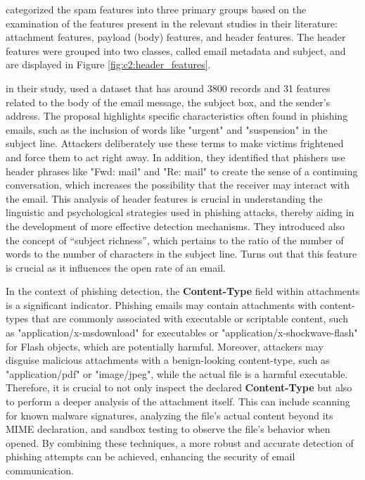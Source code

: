 
\citet{8257764} categorized the spam features into three primary groups based on the examination of the features present in the relevant studies in their literature: attachment features, payload (body) features, and header features. The header features were grouped into two classes, called email metadata and subject, and are displayed in Figure \ref{fig:c2:header_features}.



\citet{Abadla202312} in their study, used a dataset that has around 3800 records and 31 features related to the body of the email message, the subject box, and the sender’s address.
The proposal highlights specific characteristics often found in phishing emails, such as the inclusion of words like "urgent" and "suspension" in the subject line. Attackers deliberately use these terms to make victims frightened and force them to act right away. In addition, they identified that phishers use header phrases like "Fwd: mail" and "Re: mail" to create the sense of a continuing conversation, which increases the possibility that the receiver may interact with the email. This analysis of header features is crucial in understanding the linguistic and psychological strategies used in phishing attacks, thereby aiding in the development of more effective detection mechanisms. They introduced also the concept of “subject richness”, which pertains to the ratio of the number of words to the number of characters in the subject line. Turns out that this feature is crucial as it influences the open rate of an email.

In the context of phishing detection, the \textbf{Content-Type} field within attachments is a significant indicator. Phishing emails may contain attachments with content-types that are commonly associated with executable or scriptable content, such as "application/x-msdownload" for executables or "application/x-shockwave-flash" for Flash objects, which are potentially harmful. Moreover, attackers may disguise malicious attachments with a benign-looking content-type, such as "application/pdf" or "image/jpeg", while the actual file is a harmful executable. Therefore, it is crucial to not only inspect the declared \textbf{Content-Type} but also to perform a deeper analysis of the attachment itself. This can include scanning for known malware signatures, analyzing the file's actual content beyond its MIME declaration, and sandbox testing to observe the file's behavior when opened. By combining these techniques, a more robust and accurate detection of phishing attempts can be achieved, enhancing the security of email communication.


